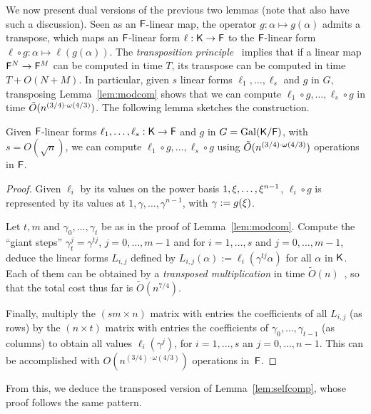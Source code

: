 We now present dual versions of the previous two lemmas (note that
\cite{KalSho98} also have such a discussion). Seen as an ${\mathsf{F}}$-linear
map, the operator $g:\alpha \mapsto g(\alpha)$ admits a transpose,
which maps an ${\mathsf{F}}$-linear form $\ell:{\mathsf{K}}\to{\mathsf{F}}$ to the ${\mathsf{F}}$-linear form
$\ell \circ g: \alpha \mapsto \ell(g(\alpha))$.  The {\em
  transposition principle}~\citep{KaKiBs88,CaKaYa89} implies that if a
linear map ${\mathsf{F}}^N \to {\mathsf{F}}^M$ can be computed in time $T$, its transpose
can be computed in time $T+O(N+M)$. In particular, given $s$ linear
forms $\ell_1,\dots,\ell_s$ and $g$ in $G$, transposing
Lemma~\ref{lem:modcom} shows that we can compute $\ell_1 \circ
g,\dots,\ell_s \circ g$ in time $\tilde{O}(n^{(3/4)\cdot \omega(4/3)})$. The following lemma
sketches the construction.

\begin{lemma}
  \label{lem:modcomT}
  Given ${\mathsf{F}}$-linear forms $\ell_1,\dots,\ell_s:{\mathsf{K}}\to {\mathsf{F}}$ and $g$ in $G =
  \mathrm{Gal}({\mathsf{K}}/{\mathsf{F}})$, with $s = O(\sqrt{n})$, we can compute
  $\ell_1\circ g,\dots,\ell_s \circ g$ 
 using $\tilde{O}(n^{(3/4)\cdot \omega(4/3)})$ operations in ${\mathsf{F}}$.
\end{lemma}
\begin{proof}
  Given $\ell_i$ by its values on the power basis $1,\xi,\dots,\xi^{n-1}$, $\ell_i \circ g$ is represented by its values at
  $1,\gamma,\dots,\gamma^{n-1}$, with $\gamma := g(\xi)$. 

  Let $t,m$ and $\gamma_0,\dots,\gamma_t$ be as in the proof of
  Lemma~\ref{lem:modcom}. Compute the ``giant steps''
  $\gamma_t^j = \gamma^{tj}$, $j=0,\dots,m-1$ and for $i=1,\dots,s$
  and $j=0,\dots,m-1$, deduce the linear forms $L_{i,j}$ defined by
  $L_{i,j}(\alpha) := \ell_i(\gamma^{tj}\alpha)$ for all $\alpha$ in
  ${\mathsf{K}}$. Each of them can be obtained by a {\em transposed
    multiplication} in time $\tilde{O}(n)$~\citep[Section~4.1]{Shoup},
  so that the total cost thus far is $\tilde{O}(n^{7/4})$.

  Finally, multiply the $(sm \times n)$ matrix with entries the
  coefficients of all $L_{i,j}$ (as rows) by the $(n \times t)$ matrix with
  entries the coefficients of $\gamma_0,\dots,\gamma_{t-1}$ (as columns) to
  obtain all values $\ell_i(\gamma^j)$, for $i=1,\dots,s$ an
  $j=0,\dots,n-1$.  This can be accomplished with
  $O(n^{(3/4)\cdot\omega(4/3)})$ operations in~${\mathsf{F}}$.
\end{proof}

From this, we deduce the transposed version of Lemma~\ref{lem:selfcomp},
whose proof follows the same pattern.

